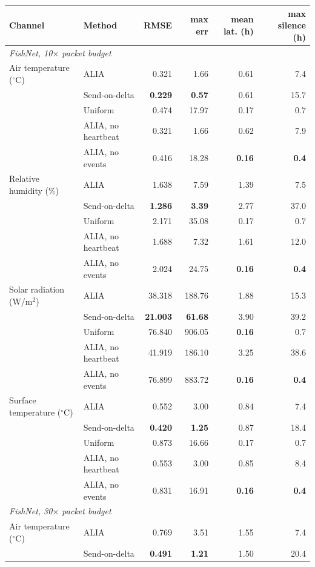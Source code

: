 \begin{tabular}{llrrrr}
\toprule
Channel & Method & RMSE & max err & mean lat. (h) & max silence (h) \\
\midrule
\multicolumn{6}{l}{\emph{FishNet, 10$\times$ packet budget}} \\
Air temperature ($^\circ$C) & ALIA & 0.321 & 1.66 & 0.61 & 7.4 \\
 & Send-on-delta & \textbf{0.229} & \textbf{0.57} & 0.61 & 15.7 \\
 & Uniform & 0.474 & 17.97 & 0.17 & 0.7 \\
 & ALIA, no heartbeat & 0.321 & 1.66 & 0.62 & 7.9 \\
 & ALIA, no events & 0.416 & 18.28 & \textbf{0.16} & \textbf{0.4} \\
Relative humidity (\%) & ALIA & 1.638 & 7.59 & 1.39 & 7.5 \\
 & Send-on-delta & \textbf{1.286} & \textbf{3.39} & 2.77 & 37.0 \\
 & Uniform & 2.171 & 35.08 & 0.17 & 0.7 \\
 & ALIA, no heartbeat & 1.688 & 7.32 & 1.61 & 12.0 \\
 & ALIA, no events & 2.024 & 24.75 & \textbf{0.16} & \textbf{0.4} \\
Solar radiation (W/m$^2$) & ALIA & 38.318 & 188.76 & 1.88 & 15.3 \\
 & Send-on-delta & \textbf{21.003} & \textbf{61.68} & 3.90 & 39.2 \\
 & Uniform & 76.840 & 906.05 & \textbf{0.16} & 0.7 \\
 & ALIA, no heartbeat & 41.919 & 186.10 & 3.25 & 38.6 \\
 & ALIA, no events & 76.899 & 883.72 & \textbf{0.16} & \textbf{0.4} \\
Surface temperature ($^\circ$C) & ALIA & 0.552 & 3.00 & 0.84 & 7.4 \\
 & Send-on-delta & \textbf{0.420} & \textbf{1.25} & 0.87 & 18.4 \\
 & Uniform & 0.873 & 16.66 & 0.17 & 0.7 \\
 & ALIA, no heartbeat & 0.553 & 3.00 & 0.85 & 8.4 \\
 & ALIA, no events & 0.831 & 16.91 & \textbf{0.16} & \textbf{0.4} \\
\midrule
\multicolumn{6}{l}{\emph{FishNet, 30$\times$ packet budget}} \\
Air temperature ($^\circ$C) & ALIA & 0.769 & 3.51 & 1.55 & 7.4 \\
 & Send-on-delta & \textbf{0.491} & \textbf{1.21} & 1.50 & 20.4 \\

\end{tabular}
